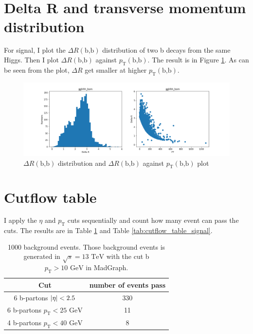 \documentclass[12pt]{article}
\begin{document}
\section{Delta R and transverse momentum distribution}%
\label{sec:delta_r_and_transverse_momentum_distribution}
	For signal, I plot the $\Delta R(\text{b,b})$ distribution of two b decays from the same Higgs. Then I plot $\Delta R(\text{b,b})$ against $p_\text{T}(\text{b,b})$. The result is in Figure \ref{fig:dR(b,b)_and_pT(b,b)}. As can be seen from the plot, $\Delta R$ get smaller at higher $p_\text{T}(\text{b,b})$. 
	\begin{figure}[htpb]
		\centering
		\includegraphics[width=1\textwidth]{gghhh_bsm_bb_Delta_R.png}
		\caption{$\Delta R(\text{b,b})$ distribution and $\Delta R(\text{b,b})$ against $p_\text{T}(\text{b,b})$ plot}
		\label{fig:dR(b,b)_and_pT(b,b)}
	\end{figure}
\section{Cutflow table}%
\label{sec:cutflow_table}
I apply the $\eta$ and $p_\text{T}$ cuts sequentially and count how many event can pass the cuts. The results are in Table \ref{tab:cutflow_table_background} and Table \ref{tab:cutflow_table_signal}.
	\begin{table}[htpb]
		\centering
		\caption{1000 background events. Those background events is generated in $\sqrt{s} = 13 \text{ TeV}$ with the cut b $p_\text{T} > 10 \text{ GeV}$ in MadGraph.
}
		\label{tab:cutflow_table_background}
		\begin{tabular}{cc}
			Cut & number of events pass \\
			\hline
			6 b-partons $\abs{\eta}<2.5$ & 330 \\
			6 b-partons $p_\text{T} < 25 \text{ GeV}$ & 11 \\
			4 b-partons $p_\text{T} < 40 \text{ GeV}$ & 8                            
		\end{tabular}	
	\end{table}
	
\end{document}
